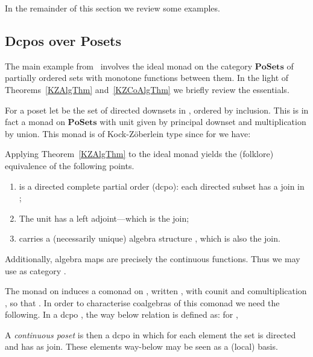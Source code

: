 \documentclass{LMCS}
\newif\ifignore \ignorefalse
\newcommand{\auxproof}[1]{
\ifignore\mbox{}\newline
\textbf{PROOF:} \dotfill\newline
{\it #1}\mbox{}\newline
\textbf{ENDPROOF}\dotfill
\fi}
\newcommand{\Cat}[1]{\ensuremath{\mathbf{#1}}}
\newcommand{\PoSets}{\Cat{PoSets}\xspace}
\begin{document}
In the remainder of this section we review some examples.


\subsection{Dcpos over Posets}\label{DcpoSubsec}

The main example from~\cite{Jacobs94b} involves the ideal monad 
on the category \PoSets of partially ordered sets with monotone
functions between them. In the light of Theorems~\ref{KZAlgThm}
and~\ref{KZCoAlgThm} we briefly review the essentials.

For a poset  let  be the set of directed
downsets in , ordered by inclusion. This  is in fact a monad
on \PoSets with unit  given by principal downset
 and multiplication  by union.  This monad is of Kock-Z{\"o}berlein type since for
 we have:


\auxproof{
For a poset  a subset  is called directed if
it is non-empty and for each pair  there is a  with . The set  contains the downclosed
directed subsets, ordered by inclusion. The mapping  yields a functor : for  one defines .
}

\noindent Applying Theorem~\ref{KZAlgThm} to the ideal monad yields the
(folklore) equivalence of the following points.
\begin{enumerate}[(1)]
\item  is a directed complete partial order (dcpo): each directed
  subset  has a join  in ; 

\item The unit 
  has a left adjoint---which is the join;

\item  carries a (necessarily unique) algebra structure , which is also the join. 
\end{enumerate}

\noindent Additionally, algebra maps are precisely the continuous
functions. Thus we may use as category .

The monad  on  induces a comonad on , written
, with counit  and comultiplication , so that . In order to characterise coalgebras
of this comonad  we need the following. In a dcpo
, the way below relation  is defined as: for ,


\noindent A \emph{continuous poset} is then a dcpo in which for each
element  the set  is
directed and has  as join. These elements way-below  may be seen
as a (local) basis.
\end{document}
